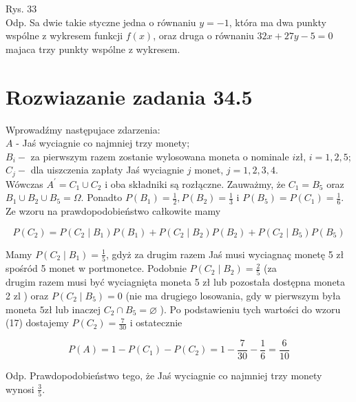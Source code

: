 \documentclass[10pt]{article}
\begin{document}
Rys. 33\\
Odp. Sa dwie takie styczne jedna o równaniu $y=-1$, która ma dwa punkty wspólne z wykresem funkcji $f(x)$, oraz druga o równaniu $32 x+27 y-5=0$ majaca trzy punkty wspólne z wykresem.

\section*{Rozwiazanie zadania 34.5}
Wprowadźmy następujace zdarzenia:\\
$A$ - Jaś wyciagnie co najmniej trzy monety;\\
$B_{i}-$ za pierwszym razem zostanie wylosowana moneta o nominale $i \mathrm{zł}$, $i=1,2,5$;\\
$C_{j}-$ dla uiszczenia zapłaty Jaś wyciagnie $j$ monet, $j=1,2,3,4$.\\
Wówczas $A^{\prime}=C_{1} \cup C_{2}$ i oba składniki są rozłączne. Zauważmy, że $C_{1}=B_{5}$ oraz $B_{1} \cup B_{2} \cup B_{5}=\Omega$. Ponadto $P\left(B_{1}\right)=\frac{1}{2}, P\left(B_{2}\right)=\frac{1}{3}$ i $P\left(B_{5}\right)=P\left(C_{1}\right)=\frac{1}{6}$. Ze wzoru na prawdopodobieństwo całkowite mamy

$$
P\left(C_{2}\right)=P\left(C_{2} \mid B_{1}\right) P\left(B_{1}\right)+P\left(C_{2} \mid B_{2}\right) P\left(B_{2}\right)+P\left(C_{2} \mid B_{5}\right) P\left(B_{5}\right)
$$

Mamy $P\left(C_{2} \mid B_{1}\right)=\frac{1}{5}$, gdyż za drugim razem Jaś musi wyciagnaç monetę 5 zł spośród 5 monet w portmonetce. Podobnie $P\left(C_{2} \mid B_{2}\right)=\frac{2}{5}$ (za\\
drugim razem musi być wyciagnięta moneta 5 zł lub pozostała dostępna moneta 2 zl ) oraz $P\left(C_{2} \mid B_{5}\right)=0$ (nie ma drugiego losowania, gdy w pierwszym była moneta $5 \mathrm{zł}$ lub inaczej $C_{2} \cap B_{5}=\varnothing$ ). Po podstawieniu tych wartości do wzoru (17) dostajemy $P\left(C_{2}\right)=\frac{7}{30}$ i ostatecznie

$$
P(A)=1-P\left(C_{1}\right)-P\left(C_{2}\right)=1-\frac{7}{30}-\frac{1}{6}=\frac{6}{10}
$$

Odp. Prawdopodobieństwo tego, że Jaś wyciagnie co najmniej trzy monety wynosi $\frac{3}{5}$.
\end{document}
